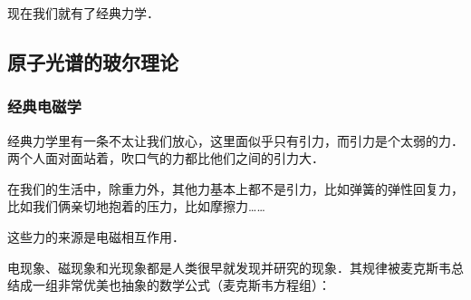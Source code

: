 现在我们就有了经典力学．

\subsection{原子光谱的玻尔理论}

\subsubsection{经典电磁学}

经典力学里有一条不太让我们放心，这里面似乎只有引力，而引力是个太弱的力．两个人面对面站着，吹口气的力都比他们之间的引力大．

在我们的生活中，除重力外，其他力基本上都不是引力，比如弹簧的弹性回复力，比如我们俩亲切地抱着的压力，比如摩擦力……

这些力的来源是电磁相互作用．

电现象、磁现象和光现象都是人类很早就发现并研究的现象．其规律被麦克斯韦总结成一组非常优美也抽象的数学公式（麦克斯韦方程组）：

